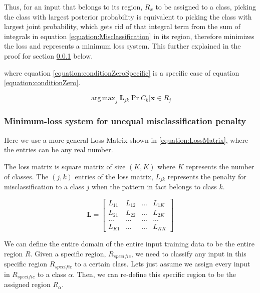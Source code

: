 \documentclass[a4paper,12pt]{article}
\DeclareMathOperator*{\argmax}{arg\,max}
\begin{document}
Thus, for an input that belongs to its region, $R_{x}$ to be assigned to a class, picking the class with largest posterior probability is equivalent to picking the class with largest joint probability, which gets rid of that integral term from the sum of integrals in equation \ref{equation:Misclassification} in its region, therefore minimizes the loss and represents a minimum loss system. This further explained in the proof for section \ref{section:MinimumLossGeneral} below. 

where equation \ref{equation:conditionZeroSpecific} is a specific case of equation \ref{equation:conditionZero}. 

\begin{equation}
\label{equation:conditionZeroSpecific}
\argmax_j \mathbf{L}_{jk} \Pr{C_{k} | \mathbf{x} \in R_{j}} 
\end{equation}

\clearpage
\subsubsection{Minimum-loss system for unequal misclassification penalty}
\label{section:MinimumLossGeneral}

Here we use a more general Loss Matrix shown in \ref{equation:LossMatrix}, where the entries can be any real number.  

The loss matrix is square matrix of size $(K,K)$ where $K$ represents the number of classes. 
The $(j,k)$ entries of the loss matrix, $L_{jk}$ represents the penalty for misclassification to a class $j$ when the pattern in fact belongs to class $k$. 

\begin{equation}
\label{equation:LossMatrix}
\mathbf{L} =
  \begin{bmatrix}
    L_{11} & L_{12} & ... & L_{1K} \\
    L_{21} & L_{22} & ... & L_{2K} \\
    ... & ... & ... & ... \\
    L_{K1} & ... & ... & L_{KK}
  \end{bmatrix}
\end{equation}

We can define the entire domain of the entire input training data to be the entire region $R$. 
Given a specific region, $R_{specific}$, we need to classify any input in this specific region $R_{specific}$ to a certain class. Lets just assume we assign every input in $R_{specific}$  to a class $\alpha$. Then, we can re-define this specific region to be the assigned region $R_{\alpha}$. 
\end{document}
